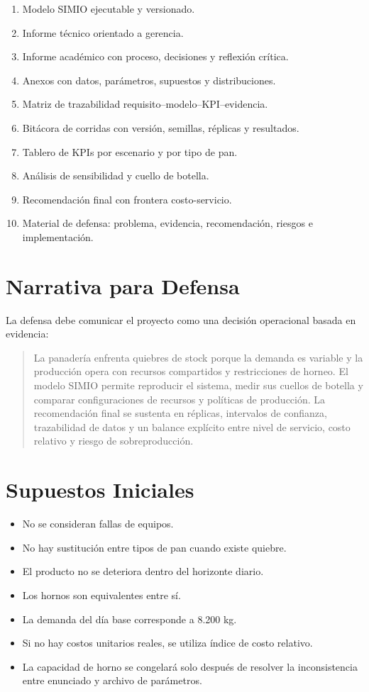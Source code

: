 \documentclass[11pt,letterpaper]{article}
\begin{document}
\begin{enumerate}
  \item Modelo SIMIO ejecutable y versionado.
  \item Informe técnico orientado a gerencia.
  \item Informe académico con proceso, decisiones y reflexión crítica.
  \item Anexos con datos, parámetros, supuestos y distribuciones.
  \item Matriz de trazabilidad requisito--modelo--KPI--evidencia.
  \item Bitácora de corridas con versión, semillas, réplicas y resultados.
  \item Tablero de KPIs por escenario y por tipo de pan.
  \item Análisis de sensibilidad y cuello de botella.
  \item Recomendación final con frontera costo-servicio.
  \item Material de defensa: problema, evidencia, recomendación, riesgos e implementación.
\end{enumerate}

\section{Narrativa para Defensa}

La defensa debe comunicar el proyecto como una decisión operacional basada en evidencia:

\begin{quote}
La panadería enfrenta quiebres de stock porque la demanda es variable y la producción opera con recursos compartidos y restricciones de horneo. El modelo SIMIO permite reproducir el sistema, medir sus cuellos de botella y comparar configuraciones de recursos y políticas de producción. La recomendación final se sustenta en réplicas, intervalos de confianza, trazabilidad de datos y un balance explícito entre nivel de servicio, costo relativo y riesgo de sobreproducción.
\end{quote}

\section{Supuestos Iniciales}

\begin{itemize}
  \item No se consideran fallas de equipos.
  \item No hay sustitución entre tipos de pan cuando existe quiebre.
  \item El producto no se deteriora dentro del horizonte diario.
  \item Los hornos son equivalentes entre sí.
  \item La demanda del día base corresponde a 8.200 kg.
  \item Si no hay costos unitarios reales, se utiliza índice de costo relativo.
  \item La capacidad de horno se congelará solo después de resolver la inconsistencia entre enunciado y archivo de parámetros.
\end{itemize}
\end{document}
